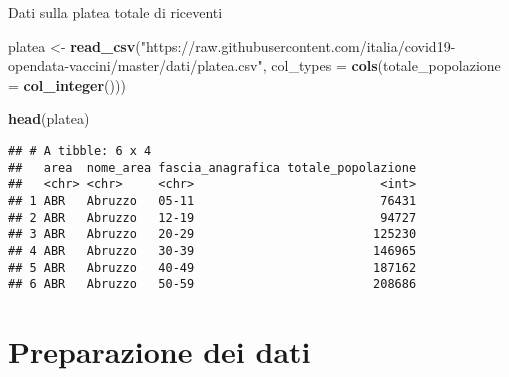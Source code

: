 \documentclass[]{article}
\newenvironment{Shaded}{\begin{snugshade}}{\end{snugshade}}
\newcommand{\KeywordTok}[1]{\textcolor[rgb]{0.13,0.29,0.53}{\textbf{#1}}}
\newcommand{\DataTypeTok}[1]{\textcolor[rgb]{0.13,0.29,0.53}{#1}}
\newcommand{\StringTok}[1]{\textcolor[rgb]{0.31,0.60,0.02}{#1}}
\newcommand{\OperatorTok}[1]{\textcolor[rgb]{0.81,0.36,0.00}{\textbf{#1}}}
\newcommand{\NormalTok}[1]{#1}
\begin{document}
Dati sulla platea totale di riceventi

\begin{Shaded}
\begin{Highlighting}[]
\NormalTok{platea <-}\StringTok{ }\KeywordTok{read_csv}\NormalTok{(}\StringTok{"https://raw.githubusercontent.com/italia/covid19-opendata-vaccini/master/dati/platea.csv"}\NormalTok{, }
    \DataTypeTok{col_types =} \KeywordTok{cols}\NormalTok{(}\DataTypeTok{totale_popolazione =} \KeywordTok{col_integer}\NormalTok{()))}

\KeywordTok{head}\NormalTok{(platea)}
\end{Highlighting}
\end{Shaded}

\begin{verbatim}
## # A tibble: 6 x 4
##   area  nome_area fascia_anagrafica totale_popolazione
##   <chr> <chr>     <chr>                          <int>
## 1 ABR   Abruzzo   05-11                          76431
## 2 ABR   Abruzzo   12-19                          94727
## 3 ABR   Abruzzo   20-29                         125230
## 4 ABR   Abruzzo   30-39                         146965
## 5 ABR   Abruzzo   40-49                         187162
## 6 ABR   Abruzzo   50-59                         208686
\end{verbatim}

\section{Preparazione dei dati}\label{preparazione-dei-dati}

\begin{Shaded}
\end{Shaded}
\end{document}
